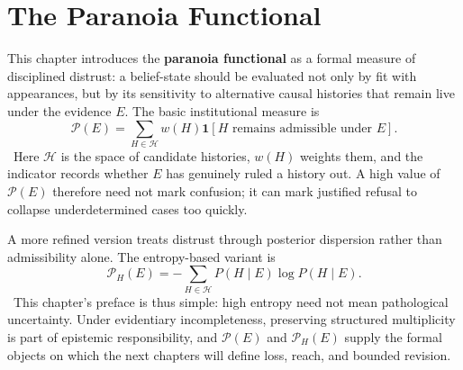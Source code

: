
\chapter{The Paranoia Functional}
\label{ch:ch071}

This chapter introduces the \textbf{paranoia functional} as a formal measure of disciplined distrust: a belief-state should be evaluated not only by fit with appearances, but by its sensitivity to alternative causal histories that remain live under the evidence \(E\). The basic institutional measure is
\[
\mathcal P(E)
=
\sum_{H\in\mathcal H}
w(H)\mathbf 1[H\text{ remains admissible under }E].
\]
\Definition\ Here \(\mathcal H\) is the space of candidate histories, \(w(H)\) weights them, and the indicator records whether \(E\) has genuinely ruled a history out. A high value of \(\mathcal P(E)\) therefore need not mark confusion; it can mark justified refusal to collapse underdetermined cases too quickly.

A more refined version treats distrust through posterior dispersion rather than admissibility alone. The entropy-based variant is
\[
\mathcal P_H(E)
=
-\sum_{H\in\mathcal H}
P(H\mid E)\log P(H\mid E).
\]
\Definition\ This chapter's preface is thus simple: high entropy need not mean pathological uncertainty. Under evidentiary incompleteness, preserving structured multiplicity is part of epistemic responsibility, and \(\mathcal P(E)\) and \(\mathcal P_H(E)\) supply the formal objects on which the next chapters will define loss, reach, and bounded revision.
